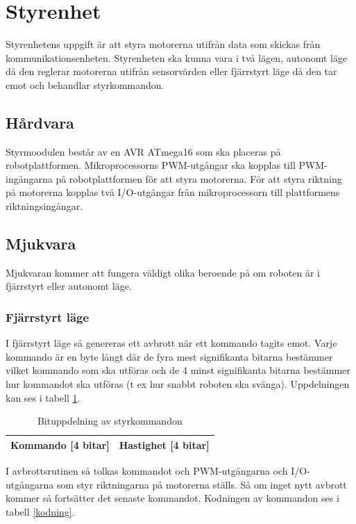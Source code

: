 \section{Styrenhet}
Styrenhetens uppgift är att styra motorerna utifrån data som skickas från kommunikationsenheten.
Styrenheten ska kunna vara i två lägen, autonomt läge då den reglerar motorerna utifrån sensorvärden eller 
fjärrstyrt läge då den tar emot och behandlar styrkommandon.
\subsection{Hårdvara}
Styrmoodulen består av en AVR ATmega16 som ska placeras på robotplattformen.
Mikroprocessorns PWM-utgångar ska kopplas till PWM-ingångarna på robotplattformen för att styra motorerna.
För att styra riktning på motorerna kopplas två I/O-utgångar från mikroprocessorn till plattformens riktningsingångar.
\subsection{Mjukvara}
Mjukvaran kommer att fungera väldigt olika beroende på om roboten är i fjärrstyrt eller autonomt läge.
\subsubsection{Fjärrstyrt läge}
I fjärrstyrt läge så genereras ett avbrott när ett kommando tagits emot.
Varje kommando är en byte långt där de fyra mest signifikanta bitarna bestämmer vilket kommando som ska utföras
och de 4 minst signifikanta bitarna bestämmer hur kommandot ska utföras (t ex hur snabbt roboten ska svänga).
Uppdelningen kan ses i tabell \ref{styrbitar}.

\begin{table}[h] 
        \label{styrbitar}
        \begin{center}
                \begin{tabular}{| c | c |}
                        \hline
                        Kommando [4 bitar] & Hastighet [4 bitar] \\ \hline
                \end{tabular}
        \end{center}
        \caption{Bituppdelning av styrkommandon}
\end{table}
I avbrottsrutinen så tolkas kommandot och PWM-utgångarna och I/O-utgångarna som styr riktningarna på motorerna ställs.
Så om inget nytt avbrott kommer så fortsätter det senaste kommandot.
Kodningen av kommandon ses i tabell \ref{kodning}.

